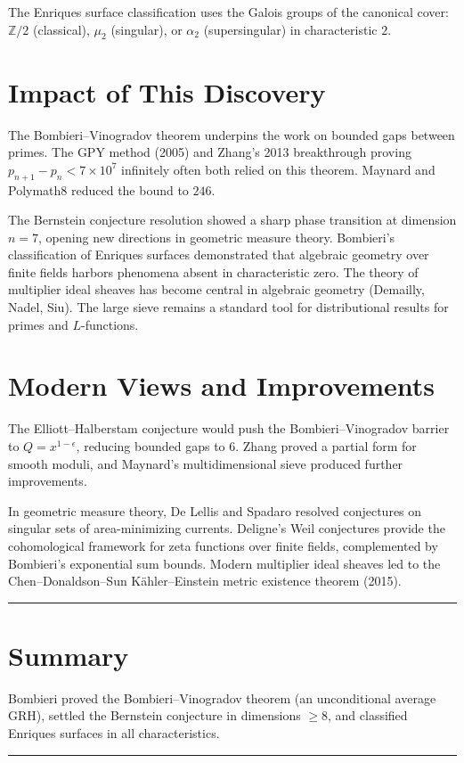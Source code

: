 The Enriques surface classification uses the Galois groups of the
canonical cover: $\mathbb{Z}/2$ (classical), $\mu_2$ (singular), or
$\alpha_2$ (supersingular) in characteristic $2$.

\section{Impact of This Discovery}

The Bombieri--Vinogradov theorem underpins the work on bounded gaps
between primes. The GPY method (2005) and Zhang's 2013 breakthrough
proving $p_{n+1} - p_n < 7 \times 10^7$ infinitely often both relied
on this theorem. Maynard and Polymath8 reduced the bound to $246$.

The Bernstein conjecture resolution showed a sharp phase transition at
dimension $n = 7$, opening new directions in geometric measure theory.
Bombieri's classification of Enriques surfaces \cite{bombieri1973} demonstrated that algebraic
geometry over finite fields harbors phenomena absent in characteristic zero.
The theory of multiplier ideal sheaves has become central in algebraic
geometry (Demailly, Nadel, Siu). The large sieve remains a standard tool
for distributional results for primes and $L$-functions.

\section{Modern Views and Improvements}

The Elliott--Halberstam conjecture would push the Bombieri--Vinogradov
barrier to $Q = x^{1-\epsilon}$, reducing bounded gaps to $6$. Zhang
proved a partial form for smooth moduli, and Maynard's multidimensional
sieve produced further improvements.

In geometric measure theory, De Lellis and Spadaro resolved conjectures
on singular sets of area-minimizing currents. Deligne's Weil conjectures
provide the cohomological framework for zeta functions over finite fields,
complemented by Bombieri's exponential sum bounds. Modern multiplier ideal
sheaves led to the Chen--Donaldson--Sun K\"{a}hler--Einstein metric
existence theorem (2015).

\begin{center}\rule{0.5\linewidth}{0.5pt}\end{center}

\section*{Summary}

Bombieri proved the Bombieri--Vinogradov theorem (an unconditional average
GRH), settled the Bernstein conjecture in dimensions $\ge 8$, and classified
Enriques surfaces in all characteristics.

\begin{center}\rule{0.5\linewidth}{0.5pt}\end{center}
